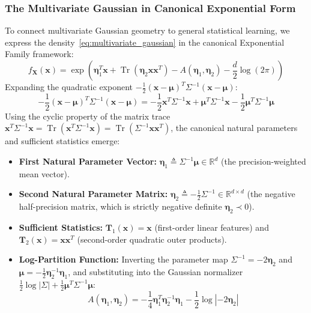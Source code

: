 \subsubsection{The Multivariate Gaussian in Canonical Exponential Form}
To connect multivariate Gaussian geometry to general statistical learning, we express the density~\eqref{eq:multivariate_gaussian} in the canonical Exponential Family framework:
\begin{equation}
f_{\mathbf{X}}(\mathbf{x}) = \exp\left( \boldsymbol{\eta}_1^T \mathbf{x} + \operatorname{Tr}(\boldsymbol{\eta}_2 \mathbf{x}\mathbf{x}^T) - A(\boldsymbol{\eta}_1, \boldsymbol{\eta}_2) - \frac{d}{2}\log(2\pi) \right)
\label{eq:multivariate_gaussian_canonical}
\end{equation}
Expanding the quadratic exponent $-\frac{1}{2}(\mathbf{x} - \boldsymbol{\mu})^T \Sigma^{-1} (\mathbf{x} - \boldsymbol{\mu})$:
\begin{equation}
-\frac{1}{2}(\mathbf{x} - \boldsymbol{\mu})^T \Sigma^{-1} (\mathbf{x} - \boldsymbol{\mu}) = -\frac{1}{2}\mathbf{x}^T \Sigma^{-1}\mathbf{x} + \boldsymbol{\mu}^T \Sigma^{-1}\mathbf{x} - \frac{1}{2}\boldsymbol{\mu}^T \Sigma^{-1}\boldsymbol{\mu}
\end{equation}
Using the cyclic property of the matrix trace $\mathbf{x}^T \Sigma^{-1}\mathbf{x} = \operatorname{Tr}(\mathbf{x}^T \Sigma^{-1}\mathbf{x}) = \operatorname{Tr}(\Sigma^{-1} \mathbf{x}\mathbf{x}^T)$, the canonical natural parameters and sufficient statistics emerge:
\begin{itemize}
    \item \textbf{First Natural Parameter Vector:} $\boldsymbol{\eta}_1 \triangleq \Sigma^{-1}\boldsymbol{\mu} \in \mathbb{R}^d$ (the precision-weighted mean vector).
    \item \textbf{Second Natural Parameter Matrix:} $\boldsymbol{\eta}_2 \triangleq -\frac{1}{2}\Sigma^{-1} \in \mathbb{R}^{d \times d}$ (the negative half-precision matrix, which is strictly negative definite $\boldsymbol{\eta}_2 \prec 0$).
    \item \textbf{Sufficient Statistics:} $\mathbf{T}_1(\mathbf{x}) = \mathbf{x}$ (first-order linear features) and $\mathbf{T}_2(\mathbf{x}) = \mathbf{x}\mathbf{x}^T$ (second-order quadratic outer products).
    \item \textbf{Log-Partition Function:} Inverting the parameter map $\Sigma^{-1} = -2\boldsymbol{\eta}_2$ and $\boldsymbol{\mu} = -\frac{1}{2}\boldsymbol{\eta}_2^{-1}\boldsymbol{\eta}_1$, and substituting into the Gaussian normalizer $\frac{1}{2}\log|\Sigma| + \frac{1}{2}\boldsymbol{\mu}^T \Sigma^{-1}\boldsymbol{\mu}$:
    \begin{equation}
    A(\boldsymbol{\eta}_1, \boldsymbol{\eta}_2) = -\frac{1}{4}\boldsymbol{\eta}_1^T \boldsymbol{\eta}_2^{-1}\boldsymbol{\eta}_1 - \frac{1}{2}\log|-2\boldsymbol{\eta}_2|
    \label{eq:multivariate_gaussian_A}
    \end{equation}
\end{itemize}
